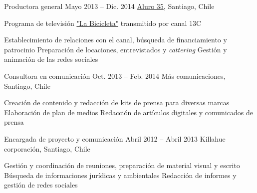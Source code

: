 \begin{joblist}
{{\begin{itemize}
			\end{itemize}     
        }
	}
    
    
    
\item[Productora general]{Mayo 2013 -- Dic. 2014}
     {     
     \href{https://www.aluro35.com/}  {Aluro 35}, Santiago, Chile
     }
     {Programa de televisión \href{http://www.13.cl/c/programas/la-bicicleta}{"La Bicicleta"} transmitido por canal 13C \\
		\normalsize{
		\iftbftiny \vspace{-0.5cm} \fi
			\begin{itemize}
			  \iftbftiny \setlength\itemsep{-3pt} \fi
			  \cvitem[\checkmark] Establecimiento de relaciones con el canal, búsqueda de financiamiento y patrocinio              
			  \cvitem[\checkmark] Preparación de locaciones, entrevistados y \textit{cattering}
			  \cvitem[\checkmark] Gestión y animación de las redes sociales      
			\end{itemize}     
        }
	}



\item[Consultora en comunicación]{Oct. 2013 -- Feb. 2014 }     
  	{
  	Más comunicaciones, Santiago, Chile
  	}     
  	{
		\normalsize{
		\iftbftiny \vspace{-0.5cm} \fi
		\begin{itemize}
			  \iftbftiny \setlength\itemsep{-3pt} \fi
			  \cvitem[\checkmark]  Creación de contenido y redacción de kits de prensa para diversas marcas                                       
			  \cvitem[\checkmark]  Elaboración de plan de medios                                       
			  \cvitem[\checkmark]  Redacción de artículos digitales y comunicados de prensa

		\end{itemize}       
        }
	}

\item[Encargada de proyecto y comunicación]{Abril 2012 -- Abril 2013 \vspace{0.2cm}}     
  	{
  	Killahue corporación, Santiago, Chile
  	}     
  	{
       
        \normalsize{
		\iftbftiny \vspace{-0.5cm} \fi
		\begin{itemize}
			  \iftbftiny \setlength\itemsep{-3pt} \fi
			  \cvitem[\checkmark] Gestión y coordinación de reuniones, preparación de material visual y escrito                                   
			  \cvitem[\checkmark] Búsqueda de informaciones jurídicas y ambientales
			  \cvitem[\checkmark] Redacción de informes y gestión de redes sociales                                       
		\end{itemize}  
		}
	}


   

\end{joblist}


